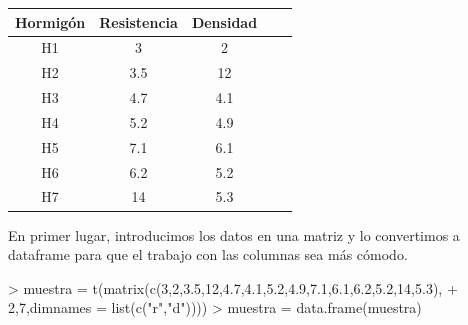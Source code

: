 \documentclass [a4paper] {article}
\begin{document}
\begin{table}[H]
\begin{center}
\begin{tabular}{|c|c|c|c|c|}
\hline
Hormigón & Resistencia & Densidad\\
\hline \hline
H1 & 3 & 2 \\ \hline
H2 & 3.5 & 12 \\ \hline
H3 & 4.7 & 4.1 \\ \hline
H4 & 5.2 & 4.9 \\ \hline
H5 & 7.1 & 6.1 \\ \hline
H6 & 6.2 & 5.2 \\ \hline
H7 & 14 & 5.3 \\ \hline
\end{tabular}
\end{center}
\end{table}

\bigskip
En primer lugar, introducimos los datos en una matriz y lo convertimos a dataframe para que el trabajo con las 
columnas sea más cómodo.
\begin{Schunk}
\begin{Sinput}
> muestra = t(matrix(c(3,2,3.5,12,4.7,4.1,5.2,4.9,7.1,6.1,6.2,5.2,14,5.3),
+         2,7,dimnames = list(c("r","d"))))
> muestra = data.frame(muestra)
\end{Sinput}
\end{Schunk}
\end{document}
